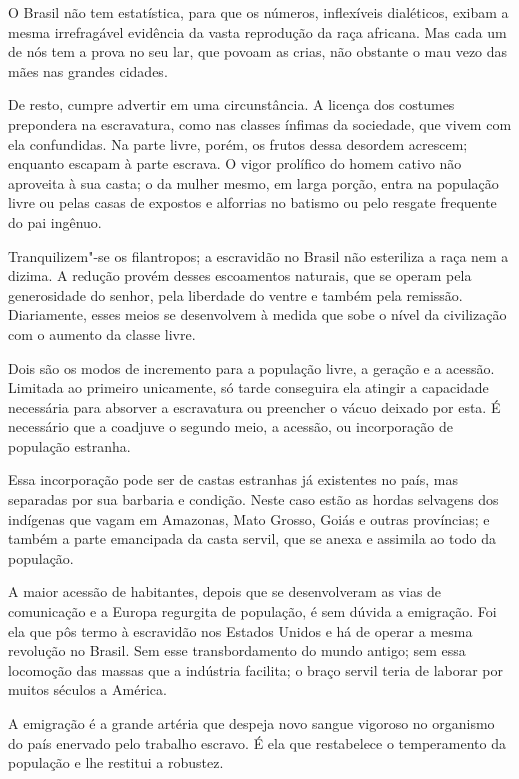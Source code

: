 \begin{linenumbers}
 O Brasil não tem estatística, para que os números, inflexíveis
dialéticos, exibam a mesma irrefragável evidência da vasta reprodução
da raça africana. Mas cada um de nós tem a prova no seu lar, que povoam
as crias, não obstante o mau vezo das mães nas grandes cidades. 

 De resto, cumpre advertir em uma circunstância. A licença dos costumes
prepondera na escravatura, como nas classes ínfimas da sociedade, que
vivem com ela confundidas. Na parte livre, porém, os frutos dessa
desordem acrescem; enquanto escapam à parte escrava. O vigor prolífico
do homem cativo não aproveita à sua casta; o da mulher mesmo, em larga
porção, entra na população livre ou pelas casas de expostos e alforrias
no batismo ou pelo resgate frequente do pai ingênuo.

 Tranquilizem"-se os filantropos; a escravidão no Brasil não esteriliza \label{filantropo}
a raça nem a dizima. A redução provém desses escoamentos naturais, que
se operam pela generosidade do senhor, pela liberdade do ventre e
também pela remissão. Diariamente, esses meios se desenvolvem à medida
que sobe o nível da civilização com o aumento da classe livre.

 Dois são os modos de incremento para a população livre, a geração e a
acessão. Limitada ao primeiro unicamente, só tarde conseguira ela
atingir a capacidade necessária para absorver a escravatura ou
preencher o vácuo deixado por esta. É necessário que a coadjuve o
segundo meio, a acessão, ou incorporação de população estranha.

 Essa incorporação pode ser de castas estranhas já existentes no país,
mas separadas por sua barbaria e condição. Neste caso estão as hordas
selvagens dos indígenas que vagam em Amazonas, Mato Grosso, Goiás e
outras províncias; e também a parte emancipada da casta servil, que se
anexa e assimila ao todo da população.

 A maior acessão de habitantes, depois que se desenvolveram as vias de
comunicação e a Europa regurgita de população, é sem dúvida a
emigração. Foi ela que pôs termo à escravidão nos Estados Unidos e há
de operar a mesma revolução no Brasil. Sem esse transbordamento do
mundo antigo; sem essa locomoção das massas que a indústria facilita; o
braço servil teria de laborar por muitos séculos a América.

 A emigração é a grande artéria que despeja novo sangue vigoroso no
organismo do país enervado pelo trabalho escravo. É ela que restabelece
o temperamento da população e lhe restitui a robustez. 


\end{linenumbers}
